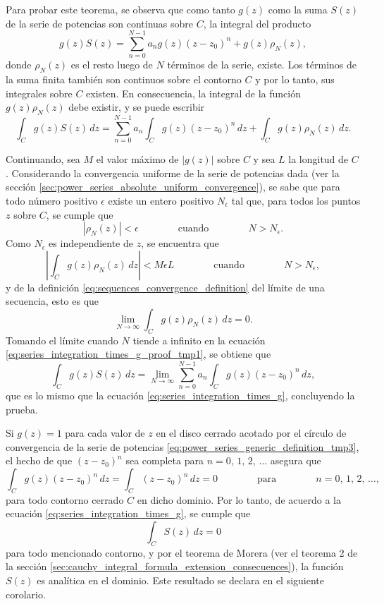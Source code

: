 \documentclass[a4paper]{report}
\begin{document}
Para probar este teorema, se observa que como tanto \(g(z)\) como la suma \(S(z)\) de la serie de potencias son continuas sobre \(C\), la integral del producto 
\[
 g(z)S(z)=\sum_{n=0}^{N-1}a_ng(z)(z-z_0)^n+g(z)\rho_N(z), 
\]
donde \(\rho_N(z)\) es el resto luego de \(N\) términos de la serie, existe. Los términos de la suma finita también son continuos sobre el contorno \(C\) y por lo tanto, sus integrales sobre \(C\) existen. En consecuencia, la integral de la función \(g(z)\rho_N(z)\) debe existir, y se puede escribir
\begin{equation}\label{eq:series_integration_times_g_proof_tmp1}
 \int_C g(z)S(z)\,dz=\sum_{n=0}^{N-1}a_n\int_C g(z)(z-z_0)^n\,dz+\int_C g(z)\rho_N(z)\,dz.
\end{equation}

Continuando, sea \(M\) el valor máximo de \(|g(z)|\) sobre \(C\) y sea \(L\) la longitud de \(C\). Considerando la convergencia uniforme de la serie de potencias dada (ver la sección \ref{sec:power_series_absolute_uniform_convergence}), se sabe que para todo número positivo \(\epsilon\) existe un entero positivo \(N_\epsilon\) tal que, para todos los puntos \(z\) sobre \(C\), se cumple que
\[
 |\rho_N(z)|<\epsilon
 \qquad\qquad\textrm{cuando}\qquad\qquad
 N>N_\epsilon. 
\]
Como \(N_\epsilon\) es independiente de \(z\), se encuentra que 
\[
 \left|\int_C g(z)\rho_N(z)\,dz\right|<M\epsilon L
 \qquad\qquad\textrm{cuando}\qquad\qquad
 N>N_\epsilon, 
\]
y de la definición \ref{eq:sequences_convergence_definition} del límite de una secuencia, esto es que
\[
 \lim_{N\to\infty}\int_C g(z)\rho_N(z)\,dz=0.
\]
Tomando el límite cuando \(N\) tiende a infinito en la ecuación \ref{eq:series_integration_times_g_proof_tmp1}, se obtiene que
\[
 \int_C g(z)S(z)\,dz=\lim_{N\to\infty}\sum_{n=0}^{N-1}a_n\int_C g(z)(z-z_0)^n\,dz,  
\]
que es lo mismo que la ecuación \ref{eq:series_integration_times_g}, concluyendo la prueba.

Si \(g(z)=1\) para cada valor de \(z\) en el disco cerrado acotado por el círculo de convergencia de la serie de potencias \ref{eq:power_series_generic_definition_tmp3}, el hecho de que \((z-z_0)^n\) sea completa para \(n=0,\,1,\,2,\,\dots\) asegura que 
\[
 \int_C g(z)(z-z_0)^n\,dz=\int_C(z-z_0)^n\,dz=0
 \qquad\qquad\textrm{para}\qquad\qquad n=0,\,1,\,2,\,\dots,
\]
para todo contorno cerrado \(C\) en dicho dominio. Por lo tanto, de acuerdo a la ecuación \ref{eq:series_integration_times_g}, se cumple que
\[
 \int_C S(z)\,dz=0
\]
para todo mencionado contorno, y por el teorema de Morera (ver el teorema 2 de la sección \ref{sec:cauchy_integral_formula_extension_consecuences}), la función \(S(z)\) es analítica en el dominio. Este resultado se declara en el siguiente corolario.
\end{document}
